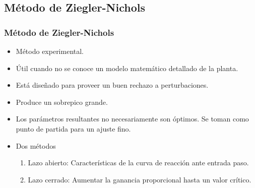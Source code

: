 \documentclass[aspectratio=169,handout]{beamer}
\theoremstyle{definition}
\theoremstyle{plain}
\theoremstyle{remark}
\begin{document}
\subsection{Método de Ziegler-Nichols}
\begin{frame}[<+->]\frametitle{Método de Ziegler-Nichols}
\begin{itemize}
	\item Método experimental.
	\item Útil cuando no se conoce un modelo matemático detallado de la planta.
	\item Está diseñado para proveer un buen rechazo a perturbaciones.
	\item Produce un sobrepico grande.
	\item Los parámetros resultantes no necesariamente son óptimos. Se toman como punto de partida para un ajuste fino.
	\item Dos métodos
	\begin{enumerate}
		\item Lazo abierto: Características de la curva de reacción ante entrada paso.
		\item Lazo cerrado: Aumentar la ganancia proporcional hasta un valor crítico.
	\end{enumerate}
\end{itemize}
\end{frame}
\end{document}
